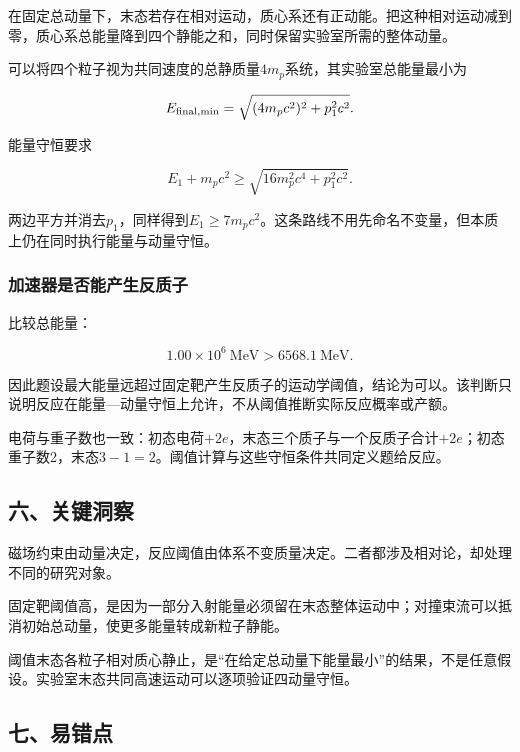 \documentclass[12pt,a4paper,fontset=fandol]{ctexart}
\begin{document}
在固定总动量下，末态若存在相对运动，质心系还有正动能。把这种相对运动减到零，质心系总能量降到四个静能之和，同时保留实验室所需的整体动量。

可以将四个粒子视为共同速度的总静质量\(4m_p\)系统，其实验室总能量最小为

\[
E_{\rm final,min}
=\sqrt{(4m_pc^2)^2+p_1^2c^2}.
\]

能量守恒要求

\[
E_1+m_pc^2
\geq\sqrt{16m_p^2c^4+p_1^2c^2}.
\]

两边平方并消去\(p_1\)，同样得到\(E_1\geq7m_pc^2\)。这条路线不用先命名不变量，但本质上仍在同时执行能量与动量守恒。

\par\noindent\begin{minipage}{\linewidth}
\subsubsection{加速器是否能产生反质子}\label{ux52a0ux901fux5668ux662fux5426ux80fdux4ea7ux751fux53cdux8d28ux5b50}

比较总能量：

\[
1.00\times10^6\ \mathrm{MeV}
>6568.1\ \mathrm{MeV}.
\]

因此题设最大能量远超过固定靶产生反质子的运动学阈值，结论为可以。该判断只说明反应在能量---动量守恒上允许，不从阈值推断实际反应概率或产额。

电荷与重子数也一致：初态电荷\(+2e\)，末态三个质子与一个反质子合计\(+2e\)；初态重子数2，末态\(3-1=2\)。阈值计算与这些守恒条件共同定义题给反应。

\end{minipage}\par
\subsection{六、关键洞察}\label{ux516dux5173ux952eux6d1eux5bdf-3}

磁场约束由动量决定，反应阈值由体系不变质量决定。二者都涉及相对论，却处理不同的研究对象。

固定靶阈值高，是因为一部分入射能量必须留在末态整体运动中；对撞束流可以抵消初始总动量，使更多能量转成新粒子静能。

阈值末态各粒子相对质心静止，是``在给定总动量下能量最小''的结果，不是任意假设。实验室末态共同高速运动可以逐项验证四动量守恒。

\subsection{七、易错点}\label{ux4e03ux6613ux9519ux70b9-3}
\end{document}
